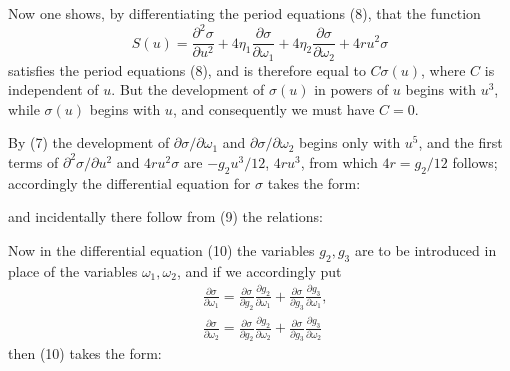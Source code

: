 
Now one shows, by differentiating the period equations
(8), that the function
\[
S(u) = \frac{\partial^2 \sigma}{\partial u^2} + 4\eta_1\frac{\partial \sigma}{\partial \omega_1} + 4\eta_2\frac{\partial \sigma}{\partial \omega_2} + 4ru^2\sigma
\]
satisfies the period equations (8), and is therefore equal to $C\sigma(u)$,
where $C$ is independent of $u$. But the development of $\sigma(u)$ in %
powers of $u$ begins with $u^3$, while $\sigma(u)$ begins with $u$,
and consequently we must have $C=0$.

By (7) the development of $\partial\sigma/\partial\omega_1$ and $\partial\sigma/\partial\omega_2$
begins only with $u^5$, and the first terms of $\partial^2\sigma/\partial u^2$ and $4ru^2\sigma$ are
$-g_2u^3/12$, $4ru^3$, from which $4r=g_2/12$ follows; accordingly
the differential equation for $\sigma$ takes the form:


and incidentally there follow from (9) the relations:


Now in the differential equation (10) the variables
$g_2, g_3$ are to be introduced in place of the variables $\omega_1, \omega_2$, and if we accordingly put
\[
\begin{aligned}
&\frac{\partial \sigma}{\partial \omega_1} = \frac{\partial \sigma}{\partial g_2}\frac{\partial g_2}{\partial \omega_1} + \frac{\partial \sigma}{\partial g_3}\frac{\partial g_3}{\partial \omega_1}, \\
&\frac{\partial \sigma}{\partial \omega_2} = \frac{\partial \sigma}{\partial g_2}\frac{\partial g_2}{\partial \omega_2} + \frac{\partial \sigma}{\partial g_3}\frac{\partial g_3}{\partial \omega_2}
\end{aligned}
\]
then (10) takes the form:

